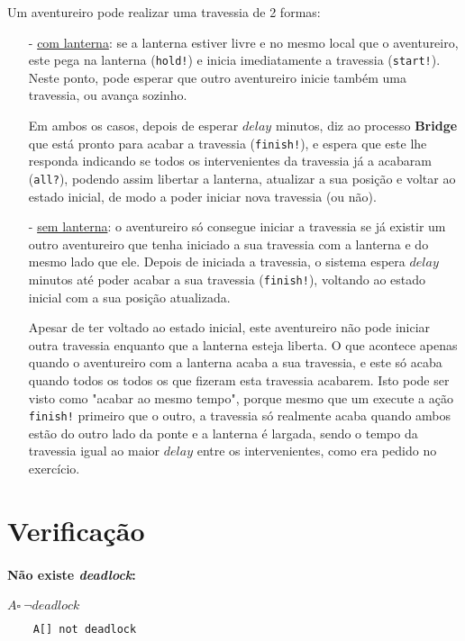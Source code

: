 \documentclass[12pt]{extarticle}
\begin{document}
Um aventureiro pode realizar uma travessia de 2 formas:
\begin{itemize}
	\item[-] \underline{com lanterna}: se a lanterna estiver livre e no mesmo local que o aventureiro, este pega na lanterna (\texttt{hold!}) e inicia imediatamente a travessia (\texttt{start!}).
	Neste ponto, pode esperar que outro aventureiro inicie também uma travessia, ou avança sozinho.
	
	Em ambos os casos, depois de esperar $delay$ minutos, diz ao processo \textbf{Bridge} que está pronto para acabar a travessia (\texttt{finish!}), e espera que este lhe responda indicando se todos os intervenientes da travessia já a acabaram (\texttt{all?}), podendo assim libertar a lanterna, atualizar a sua posição e voltar ao estado inicial, de modo a poder iniciar nova travessia (ou não).

	\item[-] \underline{sem lanterna}: o aventureiro só consegue iniciar a travessia se já existir um outro aventureiro que tenha iniciado a sua travessia com a lanterna e do mesmo lado que ele.
	Depois de iniciada a travessia, o sistema espera $delay$ minutos até poder acabar a sua travessia (\texttt{finish!}), voltando ao estado inicial com a sua posição atualizada.

	Apesar de ter voltado ao estado inicial, este aventureiro não pode iniciar outra travessia enquanto que a lanterna esteja liberta.
	O que acontece apenas quando o aventureiro com a lanterna acaba a sua travessia, e este só acaba quando todos os todos os que fizeram esta travessia acabarem. Isto pode ser visto como "acabar ao mesmo tempo", porque mesmo que um execute a ação \texttt{finish!} primeiro que o outro, a travessia só realmente acaba quando ambos estão do outro lado da ponte e a lanterna é largada, sendo o tempo da travessia igual ao maior $delay$ entre os intervenientes, como era pedido no exercício.
\end{itemize}




\section{Verificação}
\paragraph{Não existe \textit{deadlock}:}{
	$A \square\ \neg deadlock$
}

\begin{verbatim}
	A[] not deadlock
\end{verbatim}
\end{document}
